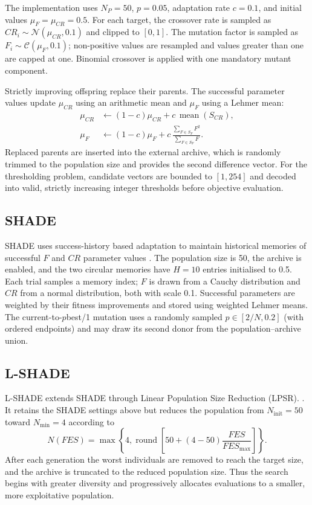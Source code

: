 \documentclass[review,authoryear]{elsarticle}
\begin{document}
The implementation uses $N_P=50$, $p=0.05$, adaptation rate $c=0.1$, and initial values $\mu_F=\mu_{CR}=0.5$. For each target, the crossover rate is sampled as $CR_i\sim\mathcal{N}(\mu_{CR},0.1)$ and clipped to $[0,1]$. The mutation factor is sampled as $F_i\sim\mathcal{C}(\mu_F,0.1)$; non-positive values are resampled and values greater than one are capped at one. Binomial crossover is applied with one mandatory mutant component. 

Strictly improving offspring replace their parents. The successful parameter values update $\mu_{CR}$ using an arithmetic mean and $\mu_F$ using a Lehmer mean: 
\begin{align} 
\mu_{CR} &\leftarrow (1-c)\mu_{CR}+c\,\operatorname{mean}(S_{CR}),\\ 
\mu_F &\leftarrow 
(1-c)\mu_F+ 
c\,\frac{\sum_{F\in S_F}F^2}{\sum_{F\in S_F}F}. 
\end{align} 
Replaced parents are inserted into the external archive, which is randomly trimmed to the population size and provides the second difference vector. For the thresholding problem, candidate vectors are bounded to $[1,254]$ and decoded into valid, strictly increasing integer thresholds before objective evaluation.


\subsection{SHADE}

SHADE uses success-history based adaptation to maintain historical
memories of successful $F$ and $CR$ parameter values
\citep{tanabe2013shade}. The population size is 50, the archive is enabled,
and the two circular memories have $H=10$ entries initialised to 0.5. Each
trial samples a memory index; $F$ is drawn from a Cauchy distribution and
$CR$ from a normal distribution, both with scale 0.1. Successful parameters
are weighted by their fitness improvements and stored using weighted Lehmer
means. The current-to-$p$best/1 mutation uses a randomly sampled
$p\in[2/N,0.2]$ (with ordered endpoints) and may draw its second donor from
the population--archive union.


\subsection{L-SHADE}

L-SHADE extends SHADE through Linear Population Size Reduction (LPSR).
\citep{tanabe2014lshade}. It retains the SHADE settings above but reduces
the population from $N_{\mathrm{init}}=50$ toward $N_{\min}=4$ according to
\begin{equation}
N(FES)=\max\left\{4,\operatorname{round}\left[
50+(4-50)\frac{FES}{FES_{\max}}\right]\right\}.
\end{equation}
After each generation the worst individuals are removed to reach the target
size, and the archive is truncated to the reduced population size. Thus the
search begins with greater diversity and progressively allocates evaluations
to a smaller, more exploitative population.
\end{document}
